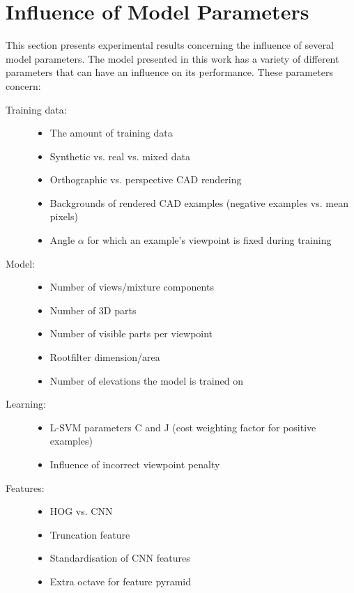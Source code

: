 
\section{Influence of Model Parameters}\label{sec:expparam}
This section presents experimental results concerning the influence of several model parameters. The model presented in this work has a variety of different parameters that can have an influence on its performance. These parameters concern:
\begin{description}
\item[Training data:] \hfill 
\begin{itemize}
\item The amount of training data
\item Synthetic vs. real vs. mixed data
\item Orthographic vs. perspective CAD rendering
\item Backgrounds of rendered CAD examples (negative examples vs. mean pixels)
\item Angle $\alpha$ for which an example's viewpoint is fixed during training
\end{itemize}
\end{description}

\begin{description}
\item[Model:] \hfill 
\begin{itemize}
\item Number of views/mixture components
\item Number of 3D parts
\item Number of visible parts per viewpoint
\item Rootfilter dimension/area
\item Number of elevations the model is trained on
\end{itemize}
\end{description}

\begin{description}
\item[Learning:] \hfill 
\begin{itemize}
\item L-SVM parameters C and J (cost weighting factor for positive examples)
\item Influence of incorrect viewpoint penalty
\end{itemize}
\end{description}

\begin{description}
\item[Features:] \hfill 
\begin{itemize}
\item HOG vs. CNN
\item Truncation feature
\item Standardisation of CNN features
\item Extra octave for feature pyramid
\end{itemize}
\end{description}

